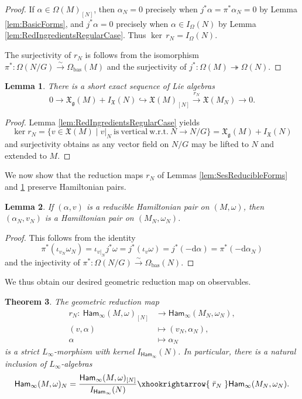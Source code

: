 \documentclass[pdftex]{sigma}
\numberwithin{equation}{section}
\newtheorem{Theorem}{Theorem}[section]
\newtheorem{Lemma}[Theorem]{Lemma}
\newcommand{\g}{\mathfrak{g}}
\newcommand{\Ham}{\mathsf{Ham}}
\newcommand{\fgmodule}{\mathfrak{X}_{\g}}
\newcommand{\vanvf}{I_{\mathfrak{X}}(N)}%
\newcommand{\X}{\mathfrak{X}}
\renewcommand{\d}{\mathrm{d}}
\begin{document}
\begin{proof}
	If $\alpha\in\Omega(M)_{[N]}$, then $\alpha_N = 0$ precisely when $j^*\alpha=\pi^*\alpha_N=0$ by Lemma \ref{lem:BasicForms}, and $j^*\alpha=0$ precisely when $\alpha\in I_\Omega(N)$ by Lemma \ref{lem:RedIngredientsRegularCase}. Thus $\ker\,r_N= I_\Omega(N)$.

	The surjectivity of $r_N$ is follows from the isomorphism $\pi^*\colon \Omega(N/G)\xrightarrow{\sim}\Omega_{\mathrm{bas}}(M)$ and the surjectivity of $j^*\colon \Omega(M)\twoheadrightarrow\Omega(N)$.
\end{proof}

\begin{Lemma}\label{lem:SesReducibleFields}
	There is a short exact sequence of Lie algebras
	\[
		0\to\fgmodule(M)+\vanvf \hookrightarrow \X(M)_{[N]}\xrightarrow{r_N}\mathfrak X(M_N)\to 0.
	\]
\end{Lemma}

\begin{proof}
	Lemma \ref{lem:RedIngredientsRegularCase} yields
	\[
		\ker r_N = \{v\in\X(M) \mid v|_N \mathrm{~is~vertical~w.r.t.~}N\to N/G\} = \fgmodule(M)+\vanvf
	\]
	and surjectivity obtains as any vector field on $N/G$ may be lifted to $N$ and extended to $M$.
\end{proof}

We now show that the reduction maps $r_N$ of Lemmas \ref{lem:SesReducibleForms} and \ref{lem:SesReducibleFields} preserve Hamiltonian pairs.

\begin{Lemma}%
	If $(\alpha,v)$ is a reducible Hamiltonian pair on $(M,\omega)$, then $(\alpha_N,v_N)$ is a Hamiltonian pair on $(M_N,\omega_N)$.
\end{Lemma}

\begin{proof}
	This follows from the identity
	\[
		\pi^*(\iota_{v_N}\omega_N) = \iota_{v|_N} j^* \omega = j^*(\iota_v\omega) = j^*(-\d\alpha) = \pi^*(-\d\alpha_N)
	\]
	and the injectivity of $\pi^*\colon \Omega(N/G)\xrightarrow{\sim}\Omega_{\mathrm{bas}}(N)$.
\end{proof}

We thus obtain our desired geometric reduction map on observables.

\begin{Theorem}\label{thm:MultiSymRed_ManifoldvsObservables}
	The geometric reduction map
	\begin{align*}
		r_N\colon \	\Ham_\infty(M,\omega)_{[N]}	&\to		\Ham_\infty(M_N,\omega_N),		\\
			(v,\alpha) 			&\mapsto	 (v_N,\alpha_N)		,	\\
			\alpha 			&\mapsto	 \alpha_N
	\end{align*}
	is a strict $L_\infty$-morphism with kernel $I_{\Ham_\infty}(N)$. In particular, there is a natural inclusion of $L_\infty$-algebras
	\[
		\Ham_\infty(M,\omega)_N = \frac{\Ham_\infty(M,\omega)_{[N]}}{I_{\Ham_\infty}(N)} \xhookrightarrow{\;\bar{r}_N\;} \Ham_\infty(M_N,\omega_N).
	\]
\end{Theorem}
\end{document}
